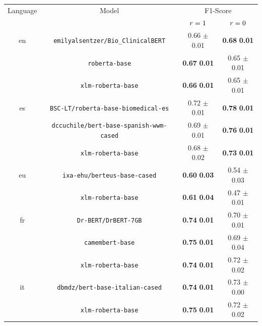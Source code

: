 \begin{tabular}{@{}cccc@{}}%
\toprule%
Language&Model&\multicolumn{2}{c}{F1-Score}\\%
&&$r=1$&$r=0$\\%
\midrule%
en&\verb|emilyalsentzer/Bio_ClinicalBERT|&0.66  $\pm$ 0.01&\textbf{0.68} \bm{$\pm$} \textbf{0.01}\\%
&\verb|roberta-base|&\textbf{0.67} \bm{$\pm$} \textbf{0.01}&0.65  $\pm$ 0.01\\%
&\verb|xlm-roberta-base|&\textbf{0.66} \bm{$\pm$} \textbf{0.01}&0.65  $\pm$ 0.01\\%
\midrule%
es&\verb|BSC-LT/roberta-base-biomedical-es|&0.72  $\pm$ 0.01&\textbf{0.78} \bm{$\pm$} \textbf{0.01}\\%
&\verb|dccuchile/bert-base-spanish-wwm-cased|&0.69  $\pm$ 0.01&\textbf{0.76} \bm{$\pm$} \textbf{0.01}\\%
&\verb|xlm-roberta-base|&0.68  $\pm$ 0.02&\textbf{0.73} \bm{$\pm$} \textbf{0.01}\\%
\midrule%
eu&\verb|ixa-ehu/berteus-base-cased|&\textbf{0.60} \bm{$\pm$} \textbf{0.03}&0.54  $\pm$ 0.03\\%
&\verb|xlm-roberta-base|&\textbf{0.61} \bm{$\pm$} \textbf{0.04}&0.47  $\pm$ 0.01\\%
\midrule%
fr&\verb|Dr-BERT/DrBERT-7GB|&\textbf{0.74} \bm{$\pm$} \textbf{0.01}&0.70  $\pm$ 0.01\\%
&\verb|camembert-base|&\textbf{0.75} \bm{$\pm$} \textbf{0.01}&0.69  $\pm$ 0.04\\%
&\verb|xlm-roberta-base|&\textbf{0.74} \bm{$\pm$} \textbf{0.01}&0.72  $\pm$ 0.02\\%
\midrule%
it&\verb|dbmdz/bert-base-italian-cased|&\textbf{0.74} \bm{$\pm$} \textbf{0.01}&0.73  $\pm$ 0.00\\%
&\verb|xlm-roberta-base|&\textbf{0.75} \bm{$\pm$} \textbf{0.01}&0.72  $\pm$ 0.02\\\bottomrule%
%
\end{tabular}